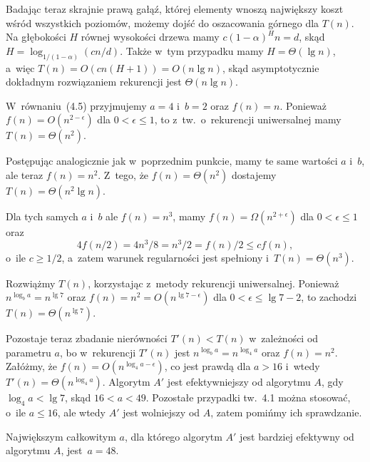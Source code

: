 Badając teraz skrajnie prawą gałąź, której elementy wnoszą największy koszt wśród wszystkich poziomów, możemy dojść do oszacowania górnego dla $T(n)$. Na głębokości $H$ równej wysokości drzewa mamy $c(1-\alpha)^Hn=d$, skąd $H=\log_{1/(1-\alpha)}(cn/d)$. Także w~tym przypadku mamy $H=\Theta(\lg n)$, a~więc $T(n)=O(cn(H+1))=O(n\lg n)$, skąd asymptotycznie dokładnym rozwiązaniem rekurencji jest $\Theta(n\lg n)$.



\exercise %

\subexercise
W~równaniu~(4.5) przyjmujemy $a=4$ i~$b=2$ oraz $f(n)=n$. Ponieważ $f(n)=O(n^{2-\epsilon})$ dla $0<\epsilon\le1$, to z~tw.~o~rekurencji uniwersalnej mamy $T(n)=\Theta(n^2)$.

\subexercise
Postępując analogicznie jak w~poprzednim punkcie, mamy te same wartości $a$ i~$b$, ale teraz $f(n)=n^2$. Z~tego, że $f(n)=\Theta(n^2)$ dostajemy $T(n)=\Theta(n^2\lg n)$.

\subexercise
Dla tych samych $a$ i~$b$ ale $f(n)=n^3$, mamy $f(n)=\Omega(n^{2+\epsilon})$ dla $0<\epsilon\le1$ oraz
\[
	4f(n/2) = 4n^3\!/8 = n^3\!/2 = f(n)/2 \le cf(n),
\]
o~ile $c\ge1/2$, a~zatem warunek regularności jest spełniony i~$T(n)=\Theta(n^3)$.

\exercise %
Rozwiążmy $T(n)$, korzystając z~metody rekurencji uniwersalnej. Ponieważ $n^{\log_ba}=n^{\lg7}$ oraz $f(n)=n^2=O(n^{\lg7-\epsilon})$ dla $0<\epsilon\le\lg7-2$, to zachodzi $T(n)=\Theta(n^{\lg7})$.

Pozostaje teraz zbadanie nierówności $T'(n)<T(n)$ w~zależności od parametru $a$, bo w~rekurencji $T'(n)$ jest $n^{\log_ba}=n^{\log_4a}$ oraz $f(n)=n^2$. Załóżmy, że $f(n)=O(n^{\log_4a-\epsilon})$, co jest prawdą dla $a>16$ i~wtedy $T'(n)=\Theta(n^{\log_4a})$. Algorytm $A'$ jest efektywniejszy od algorytmu $A$, gdy $\log_4a<\lg7$, skąd $16<a<49$. Pozostałe przypadki tw.~4.1 można stosować, o~ile $a\le16$, ale wtedy $A'$ jest wolniejszy od $A$, zatem pomińmy ich sprawdzanie.

Największym całkowitym $a$, dla którego algorytm $A'$ jest bardziej efektywny od algorytmu $A$, jest~$a=48$.

